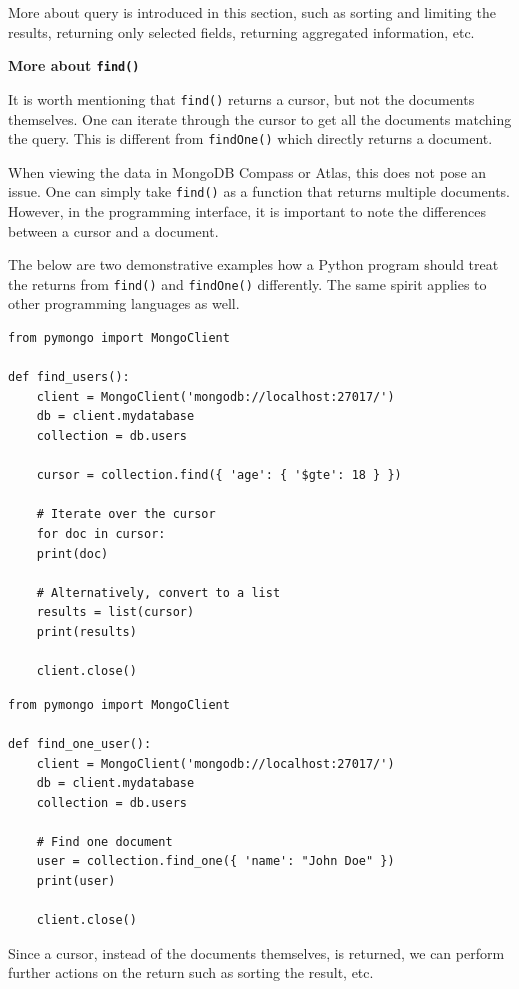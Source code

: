 More about query is introduced in this section, such as sorting and limiting the results, returning only selected fields, returning aggregated information, etc.

\vspace{0.1in}
\noindent \textbf{More about \texttt{find()}}
\vspace{0.1in}

It is worth mentioning that \verb|find()| returns a cursor, but not the documents themselves. One can iterate through the cursor to get all the documents matching the query. This is different from \verb|findOne()| which directly returns a document.

When viewing the data in MongoDB Compass or Atlas, this does not pose an issue. One can simply take \verb|find()| as a function that returns multiple documents. However, in the programming interface, it is important to note the differences between a cursor and a document.

The below are two demonstrative examples how a Python program should treat the returns from \verb|find()| and \verb|findOne()| differently. The same spirit applies to other programming languages as well.

\begin{lstlisting}
from pymongo import MongoClient

def find_users():
	client = MongoClient('mongodb://localhost:27017/')
	db = client.mydatabase
	collection = db.users

	cursor = collection.find({ 'age': { '$gte': 18 } })

	# Iterate over the cursor
	for doc in cursor:
	print(doc)
	
	# Alternatively, convert to a list
	results = list(cursor)
	print(results)

	client.close()
\end{lstlisting}

\begin{lstlisting}
from pymongo import MongoClient

def find_one_user():
	client = MongoClient('mongodb://localhost:27017/')
	db = client.mydatabase
	collection = db.users

	# Find one document
	user = collection.find_one({ 'name': "John Doe" })
	print(user)

	client.close()
\end{lstlisting}

Since a cursor, instead of the documents themselves, is returned, we can perform further actions on the return such as sorting the result, etc.

